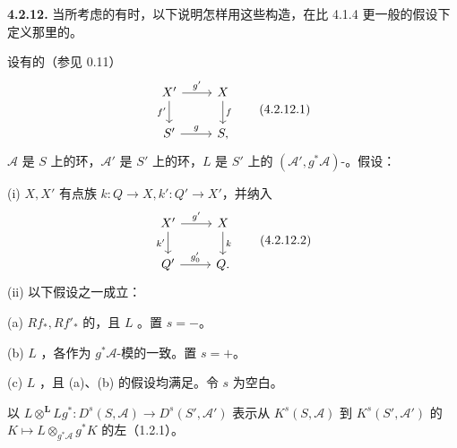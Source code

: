 \textbf{4.2.12.} 当所考虑的有时，以下说明怎样用这些构造，在比 4.1.4 更一般的假设下定义那里的。

设有的（参见 0.11）
\[\begin{tikzcd}X'\arrow[r,"g'"]\arrow[d,"f'"']&X\arrow[d,"f"]\\S'\arrow[r,"g"]&S,\end{tikzcd}\tag{4.2.12.1}\]
$\mathscr A$ 是 $S$ 上的环，$\mathscr A'$ 是 $S'$ 上的环，$L$ 是 $S'$ 上的 $(\mathscr A',g^*\mathscr A)$-。假设：

(i)  $X,X'$ 有点族 $k:Q\to X,k':Q'\to X'$，并纳入
\[\begin{tikzcd}X'\arrow[r,"g'"]\arrow[d,"k'"']&X\arrow[d,"k"]\\Q'\arrow[r,"g'_0"]&Q.\end{tikzcd}\tag{4.2.12.2}\]
(ii) 以下假设之一成立：

(a)  $Rf_*,Rf'_*$ 的，且 $L$ 。置 $s=-$。

(b) $L$ ，各作为 $g^*\mathscr A$-模的一致。置 $s=+$。

(c) $L$ ，且 (a)、(b) 的假设均满足。令 $s$ 为空白。

以 $L\otimes^{\mathbf L}Lg^*:D^s(S,\mathscr A)\to D^s(S',\mathscr A')$ 表示从 $K^s(S,\mathscr A)$ 到 $K^s(S',\mathscr A')$ 的 $K\mapsto L\otimes_{g^*\mathscr A}g^*K$ 的左（1.2.1）。

